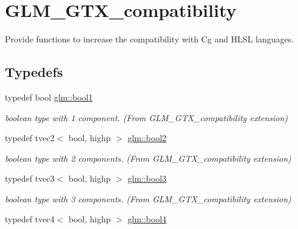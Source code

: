 \hypertarget{group__gtx__compatibility}{\section{G\-L\-M\-\_\-\-G\-T\-X\-\_\-compatibility}
\label{group__gtx__compatibility}
}


Provide functions to increase the compatibility with Cg and H\-L\-S\-L languages.  


\subsection*{Typedefs}
\begin{DoxyCompactItemize}
\item 
\hypertarget{group__gtx__compatibility_gab65f19f5170f95a2f06d6aa6482c9405}{typedef bool \hyperlink{group__gtx__compatibility_gab65f19f5170f95a2f06d6aa6482c9405}{glm\-::bool1}}\label{group__gtx__compatibility_gab65f19f5170f95a2f06d6aa6482c9405}

\begin{DoxyCompactList}\small\item\em boolean type with 1 component. (From G\-L\-M\-\_\-\-G\-T\-X\-\_\-compatibility extension) \end{DoxyCompactList}\item 
\hypertarget{group__gtx__compatibility_gabe088d78d539d2a98a2a04ab798fec1a}{typedef tvec2$<$ bool, highp $>$ \hyperlink{group__gtx__compatibility_gabe088d78d539d2a98a2a04ab798fec1a}{glm\-::bool2}}\label{group__gtx__compatibility_gabe088d78d539d2a98a2a04ab798fec1a}

\begin{DoxyCompactList}\small\item\em boolean type with 2 components. (From G\-L\-M\-\_\-\-G\-T\-X\-\_\-compatibility extension) \end{DoxyCompactList}\item 
\hypertarget{group__gtx__compatibility_gab7658aa2e0688b8ac7e640cf7e405c1e}{typedef tvec3$<$ bool, highp $>$ \hyperlink{group__gtx__compatibility_gab7658aa2e0688b8ac7e640cf7e405c1e}{glm\-::bool3}}\label{group__gtx__compatibility_gab7658aa2e0688b8ac7e640cf7e405c1e}

\begin{DoxyCompactList}\small\item\em boolean type with 3 components. (From G\-L\-M\-\_\-\-G\-T\-X\-\_\-compatibility extension) \end{DoxyCompactList}\item 
\hypertarget{group__gtx__compatibility_ga141861edebf999f94938944f0fb0777a}{typedef tvec4$<$ bool, highp $>$ \hyperlink{group__gtx__compatibility_ga141861edebf999f94938944f0fb0777a}{glm\-::bool4}}\label{group__gtx__compatibility_ga141861edebf999f94938944f0fb0777a}


\end{DoxyCompactItemize}
